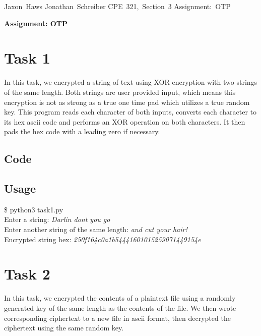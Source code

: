 \documentclass[11pt]{article}
\begin{document}
\hfill\vbox{\hbox{Jaxon Haws}
		\hbox{Jonathan Schreiber}	
		\hbox{CPE 321, Section 3}	
		\hbox{Assignment: OTP}}\par

\bigskip
\centerline{\Large\bf Assignment: OTP}\par
\bigskip

\section{Task 1}

  In this task, we encrypted a string of text using XOR encryption with two 
  strings of the same length. Both strings are user provided input, which
  means this encryption is not as strong as a true one time pad which utilizes 
  a true random key. 
  This program reads each character of both inputs, converts each character 
  to its hex ascii code and performs an XOR operation on both characters. 
  It then pads the hex code with a leading zero if necessary. 

  \subsection{Code}
    

  \subsection{Usage}
   
    {\tt\begin{tabbing}                                                                                                                                                                     
       \$ python3 task1.py\\
       Enter a string: {\it Darlin dont you go}\\
       Enter another string of the same length: {\it and cut your hair!} \\
       Encrypted string hex: {\it 250f164c0a1b54441601015259071449154e}\\
      \end{tabbing}}

\section{Task 2}

In this task, we encrypted the contents of a plaintext file using a randomly 
generated key of the same length as the contents of the file. We then wrote
corresponding ciphertext to a new file in ascii format, then decrypted the 
ciphertext using the same random key. 
\end{document}
